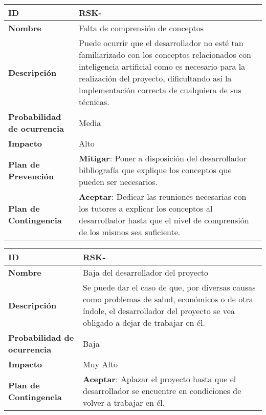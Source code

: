 \begin{center}
	\begin{tabular}{ | p{5.6cm} | p{8.5cm} | } 
		\hline
		
		\textbf{ID} & RSK-\arabic{contador_riesgos}
		{contador_riesgos} \\
		
		\hline 
		\textbf{Nombre} &
		Falta de comprensión de conceptos\\ 
		
		\hline
		\textbf{Descripción} & 
		Puede ocurrir que el desarrollador no esté tan familiarizado con los conceptos relacionados con inteligencia artificial como es necesario para la realización del proyecto, dificultando así la implementación correcta de cualquiera de sus técnicas.\\
		
		\hline 
		\textbf{Probabilidad de ocurrencia} &
		Media\\
		
		\hline 
		\textbf{Impacto} &
		Alto\\
		
		\hline 
		\textbf{Plan de Prevención} &
		\textbf{Mitigar}: Poner a disposición del desarrollador bibliografía que explique los conceptos que pueden ser necesarios.\\
		
		\hline 
		\textbf{Plan de Contingencia} &
		\textbf{Aceptar}: Dedicar las reuniones necesarias con los tutores a explicar los conceptos al desarrollador hasta que el nivel de comprensión de los mismos sea suficiente.\\
		
		
		\hline
	\end{tabular}
\end{center}

\begin{center}
	\begin{tabular}{ | p{5.6cm} | p{8.5cm} | } 
		\hline
		
		\textbf{ID} & RSK-\arabic{contador_riesgos}
		{contador_riesgos} \\
		
		\hline 
		\textbf{Nombre} &
		Baja del desarrollador del proyecto\\ 
		
		\hline
		\textbf{Descripción} & 
		Se puede dar el caso de que, por diversas causas como problemas de salud, económicos o de otra índole, el desarrollador del proyecto se vea obligado a dejar de trabajar en él.\\
		
		\hline 
		\textbf{Probabilidad de ocurrencia} &
		Baja\\
		
		\hline 
		\textbf{Impacto} &
		Muy Alto\\
		
		
		\hline 
		\textbf{Plan de Contingencia} &
		\textbf{Aceptar}: Aplazar el proyecto hasta que el desarrollador se encuentre en condiciones de volver a trabajar en él.\\
		
		
		\hline
	\end{tabular}
\end{center}

